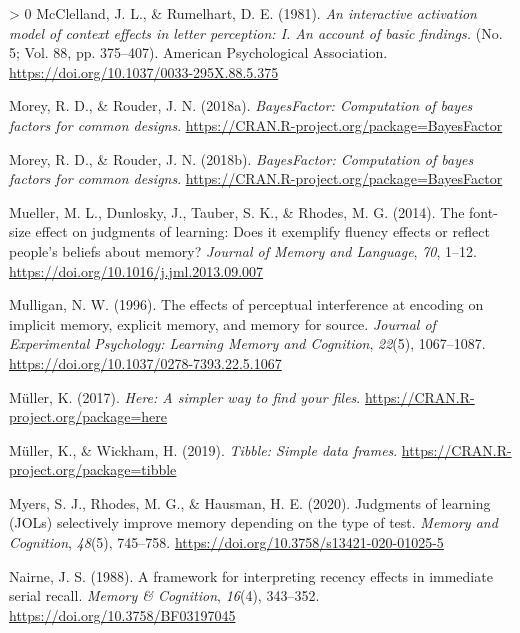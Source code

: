 \documentclass[
  english,
  jou]{apa7}
\newlength{\cslhangindent}
\newenvironment{CSLReferences}[3] %
 {%
  \setlength{\parindent}{0pt}
  \ifodd #1 \everypar{\setlength{\hangindent}{\cslhangindent}}\ignorespaces\fi
  \ifnum #2 > 0
  \setlength{\parskip}{#2\baselineskip}
  \fi
 }%
 {}
\begin{document}
\begin{CSLReferences}{1}{0}
\leavevmode\hypertarget{ref-McClelland1981}{}%
McClelland, J. L., \& Rumelhart, D. E. (1981). \emph{{An interactive activation model of context effects in letter perception: I. An account of basic findings.}} (No. 5; Vol. 88, pp. 375--407). American Psychological Association. \url{https://doi.org/10.1037/0033-295X.88.5.375}

\leavevmode\hypertarget{ref-Morey2018}{}%
Morey, R. D., \& Rouder, J. N. (2018a). \emph{BayesFactor: Computation of bayes factors for common designs}. \url{https://CRAN.R-project.org/package=BayesFactor}

\leavevmode\hypertarget{ref-R-BayesFactor}{}%
Morey, R. D., \& Rouder, J. N. (2018b). \emph{BayesFactor: Computation of bayes factors for common designs}. \url{https://CRAN.R-project.org/package=BayesFactor}

\leavevmode\hypertarget{ref-Mueller2014}{}%
Mueller, M. L., Dunlosky, J., Tauber, S. K., \& Rhodes, M. G. (2014). {The font-size effect on judgments of learning: Does it exemplify fluency effects or reflect people's beliefs about memory?} \emph{Journal of Memory and Language}, \emph{70}, 1--12. \url{https://doi.org/10.1016/j.jml.2013.09.007}

\leavevmode\hypertarget{ref-Mulligan1996}{}%
Mulligan, N. W. (1996). {The effects of perceptual interference at encoding on implicit memory, explicit memory, and memory for source}. \emph{Journal of Experimental Psychology: Learning Memory and Cognition}, \emph{22}(5), 1067--1087. \url{https://doi.org/10.1037/0278-7393.22.5.1067}

\leavevmode\hypertarget{ref-R-here}{}%
Müller, K. (2017). \emph{Here: A simpler way to find your files}. \url{https://CRAN.R-project.org/package=here}

\leavevmode\hypertarget{ref-R-tibble}{}%
Müller, K., \& Wickham, H. (2019). \emph{Tibble: Simple data frames}. \url{https://CRAN.R-project.org/package=tibble}

\leavevmode\hypertarget{ref-Myers2020}{}%
Myers, S. J., Rhodes, M. G., \& Hausman, H. E. (2020). {Judgments of learning (JOLs) selectively improve memory depending on the type of test}. \emph{Memory and Cognition}, \emph{48}(5), 745--758. \url{https://doi.org/10.3758/s13421-020-01025-5}

\leavevmode\hypertarget{ref-Nairne1988}{}%
Nairne, J. S. (1988). {A framework for interpreting recency effects in immediate serial recall}. \emph{Memory {\&} Cognition}, \emph{16}(4), 343--352. \url{https://doi.org/10.3758/BF03197045}


\end{CSLReferences}
\end{document}
